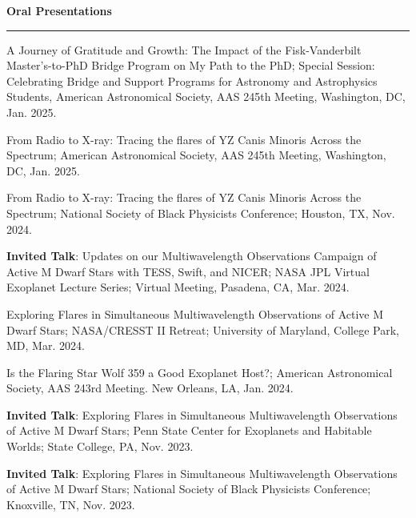 \documentclass[12pt]{article}
\begin{document}
\noindent
{\bf Oral Presentations} \\
\vspace{-10mm}
\begin{center}
\rule{\textwidth}{0.2mm}
\end{center}
\vspace{-3mm}
\noindent
\begin{etaremune}
\renewcommand\labelenumi{\bfseries\theenumi .}
\item A Journey of Gratitude and Growth: The Impact of the Fisk-Vanderbilt Master's-to-PhD Bridge Program on My Path to the PhD; Special Session: Celebrating Bridge and Support Programs for Astronomy and Astrophysics Students, American Astronomical Society, AAS 245th Meeting, Washington, DC, Jan. 2025.

\item From Radio to X-ray: Tracing the flares of YZ Canis Minoris Across the Spectrum; American Astronomical Society, AAS 245th Meeting, Washington, DC, Jan. 2025.

\item From Radio to X-ray: Tracing the flares of YZ Canis Minoris Across the Spectrum; National Society of Black Physicists Conference; Houston, TX, Nov. 2024.

\item \textbf{Invited Talk}: Updates on our Multiwavelength Observations Campaign of Active M Dwarf Stars with TESS, Swift, and NICER; NASA JPL Virtual Exoplanet Lecture Series; Virtual Meeting, Pasadena, CA, Mar. 2024. 

\item Exploring Flares in Simultaneous Multiwavelength Observations of Active M Dwarf Stars; NASA/CRESST II Retreat; University of Maryland, College Park, MD, Mar. 2024. 

\item Is the Flaring Star Wolf 359 a Good Exoplanet Host?; American Astronomical Society, AAS 243rd Meeting. New Orleans, LA, Jan. 2024.

\item \textbf{Invited Talk}: Exploring Flares in Simultaneous Multiwavelength Observations of Active M Dwarf Stars; Penn State Center for Exoplanets and Habitable Worlds; State College, PA, Nov. 2023.

\item \textbf{Invited Talk}: Exploring Flares in Simultaneous Multiwavelength Observations of Active M Dwarf Stars; National Society of Black Physicists Conference; Knoxville, TN, Nov. 2023.


\end{etaremune}
\end{document}
